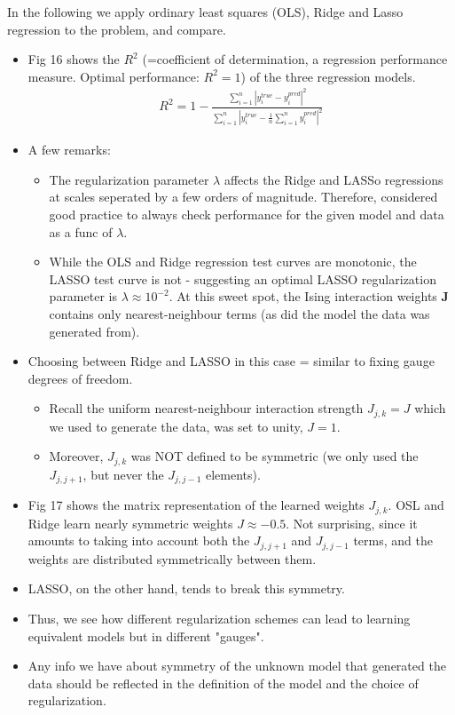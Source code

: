 \documentclass[norsk,a4paper,11pt]{article}
\begin{document}
In the following we apply ordinary least squares (OLS), Ridge and Lasso regression to the problem, and compare.
\begin{itemize}
	\item Fig 16 shows the $R^2$ (=coefficient of determination, a regression performance measure. Optimal performance: $R^2 = 1$) of the three regression models.
	\begin{align}
		R^2 = 1 - \frac{\sum_{i=1}^n |y_i^{true} - y_i^{pred}|^2 }{\sum_{i=1}^n |y_i^{true} - \frac{1}{n} \sum_{i=1}^n y_i^{pred}|^2 }
	\end{align}
	\item A few remarks:
	\begin{itemize}
		\item The regularization parameter $\lambda$ affects the Ridge and LASSo regressions at scales seperated by a few orders of magnitude. Therefore, considered good practice to always check performance for the given model and data as a func of $\lambda$. 
		\item While the OLS and Ridge regression test curves are monotonic, the LASSO test curve is not - suggesting an optimal LASSO regularization parameter is $\lambda \approx 10^{-2}$. At this sweet spot, the Ising interaction weights $\mathbf{J}$ contains only nearest-neighbour terms (as did the model the data was generated from).
	\end{itemize}
	\item Choosing between Ridge and LASSO in this case = similar to fixing gauge degrees of freedom. 
	\begin{itemize}
		\item Recall the uniform nearest-neighbour interaction strength $J_{j,k} = J$ which we used to generate the data, was set to unity, $J=1$. 
		\item Moreover, $J_{j,k}$ was NOT defined to be symmetric (we only used the $J_{j,j+1}$, but never the $J_{j,j-1}$ elements).
	\end{itemize}
	\item Fig 17 shows the matrix representation of the learned weights $J_{j,k}$. OSL and Ridge learn nearly symmetric weights $J \approx -0.5$. Not surprising, since it amounts to taking into account both the $J_{j,j+1}$ and $J_{j,j-1}$ terms, and the weights are distributed symmetrically between them.
	\item LASSO, on the other hand, tends to break this symmetry.
	\item Thus, we see how different regularization schemes can lead to learning equivalent models but in different "gauges". 
	\item Any info we have about symmetry of the unknown model that generated the data should be reflected in the definition of the model and the choice of regularization. 
\end{itemize}
\end{document}
